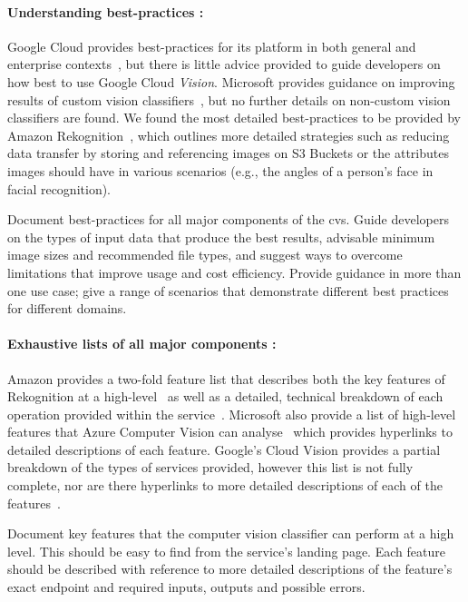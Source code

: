 \paragraph{Understanding best-practices :} Google Cloud provides best-practices for its platform in both general and enterprise contexts~, but there is little advice provided to guide developers on how best to use Google Cloud \textit{Vision}. Microsoft provides guidance on improving results of custom vision classifiers~, but no further details on non-custom vision classifiers are found. We found the most detailed best-practices to be provided by Amazon Rekognition~, which outlines more detailed strategies such as reducing data transfer by storing and referencing images on S3 Buckets or the attributes images should have in various scenarios (e.g., the angles of a person's face in facial recognition).

\begin{leftbar}
\SuggestedImprovement
Document best-practices for all major components of the \gls{cvs}. Guide developers on the types of input data that produce the best results, advisable minimum image sizes and recommended file types, and suggest ways to overcome limitations that improve usage and cost efficiency. Provide guidance in more than one use case; give a range of scenarios that demonstrate different best practices for different domains.
\end{leftbar}

\paragraph{Exhaustive lists of all major  components :} Amazon provides a two-fold feature list that describes both the key features of Rekognition at a high-level~ as well as a detailed, technical breakdown of each  operation provided within the service~. Microsoft also provide a list of high-level features that Azure Computer Vision can analyse~ which provides hyperlinks to detailed descriptions of each feature. Google's Cloud Vision  provides a partial breakdown of the types of services provided, however this list is not fully complete, nor are there hyperlinks to more detailed descriptions of each of the features~.

\begin{leftbar}
\SuggestedImprovement
Document key features that the computer vision classifier can perform at a high level. This should be easy to find from the service's landing page. Each feature should be described with reference to more detailed descriptions of the feature's exact  endpoint and required inputs, outputs and possible errors.
\end{leftbar}

